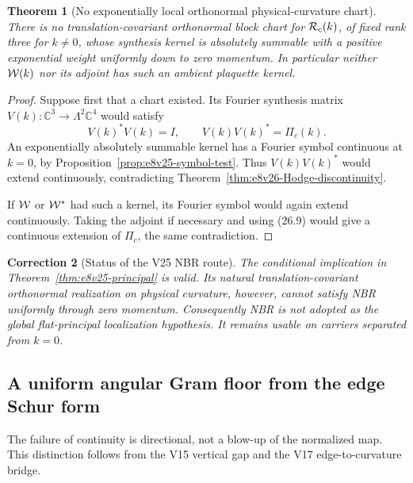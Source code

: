 \documentclass[11pt,oneside]{book}
\newtheorem{theorem}{Theorem}[chapter]
\newtheorem{correction}[theorem]{Correction}
\theoremstyle{definition}
\theoremstyle{remark}
\begin{document}
\begin{theorem}[No exponentially local orthonormal physical-curvature
chart]
\label{thm:e8v26-no-local-frame}
There is no translation-covariant orthonormal block chart for
\({\cal R}_c(k)\), of fixed rank three for \(k\ne0\), whose synthesis
kernel is absolutely summable with a positive exponential weight
uniformly down to zero momentum.  In particular neither
\({\cal W}(k)\) nor its adjoint has such an ambient plaquette kernel.
\end{theorem}

\begin{proof}
Suppose first that a chart existed.  Its Fourier synthesis matrix
\(V(k):{\mathbb C}^3\to\Lambda^2{\mathbb C}^4\) would satisfy
\[
                       V(k)^*V(k)=I,\qquad
                       V(k)V(k)^*=\Pi_c(k).                       \tag{26.10}
\]
An exponentially absolutely summable kernel has a Fourier symbol
continuous at \(k=0\), by
Proposition~\ref{prop:e8v25-symbol-test}.  Thus \(V(k)V(k)^*\) would
extend continuously, contradicting
Theorem~\ref{thm:e8v26-Hodge-discontinuity}.

If \({\cal W}\) or \({\cal W}^*\) had such a kernel, its Fourier symbol
would again extend continuously.  Taking the adjoint if necessary and
using (26.9) would give a continuous extension of \(\Pi_c\), the same
contradiction.
\end{proof}

\begin{correction}[Status of the V25 NBR route]
\label{corr:e8v26-NBR}
The conditional implication in
Theorem~\ref{thm:e8v25-principal} is valid.  Its natural
translation-covariant orthonormal realization on physical curvature,
however, cannot satisfy NBR uniformly through zero momentum.
Consequently NBR is not adopted as the global flat-principal
localization hypothesis.  It remains usable on carriers separated
from \(k=0\).
\end{correction}

\subsection{A uniform angular Gram floor from the edge Schur form}

The failure of continuity is directional, not a blow-up of the
normalized map.  This distinction follows from the V15 vertical gap
and the V17 edge-to-curvature bridge.
\end{document}
